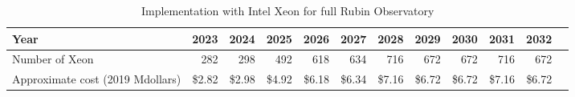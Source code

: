\tiny \begin{longtable} { |p{}  |r  |r  |r  |r  |r  |r  |r  |r  |r  |r  |r |} 
\caption{Implementation with Intel Xeon for full Rubin Observatory \label{tab:opsXeon}}\\ 
\hline 
\textbf{Year}&\textbf{2023}&\textbf{2024}&\textbf{2025}&\textbf{2026}&\textbf{2027}&\textbf{2028}&\textbf{2029}&\textbf{2030}&\textbf{2031}&\textbf{2032} \\ \hline
{Number of Xeon}&{282}&{298}&{492}&{618}&{634}&{716}&{672}&{672}&{716}&{672} \\ \hline
{Approximate cost (2019 Mdollars)}&{\$2.82}&{\$2.98}&{\$4.92}&{\$6.18}&{\$6.34}&{\$7.16}&{\$6.72}&{\$6.72}&{\$7.16}&{\$6.72} \\ \hline
\end{longtable} \normalsize
